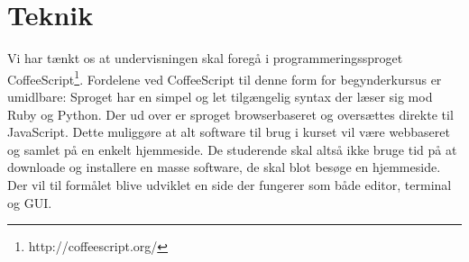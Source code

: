 \documentclass[12pt]{article}
\begin{document}
\section{Teknik}
Vi har tænkt os at undervisningen skal foregå i programmeringssproget 
CoffeeScript\footnote{http://coffeescript.org/}. Fordelene ved CoffeeScript
til denne form for begynderkursus er umidlbare: Sproget har en simpel og let 
tilgængelig syntax der læser sig mod Ruby og Python. Der ud over er sproget
browserbaseret og oversættes direkte til JavaScript. Dette muliggøre at alt 
software til brug i kurset vil være webbaseret og samlet på en enkelt hjemmeside.
De studerende skal altså ikke bruge tid på at downloade og installere en masse
software, de skal blot besøge en hjemmeside. Der vil til formålet blive udviklet
en side der fungerer som både editor, terminal og GUI.

\end{document}
